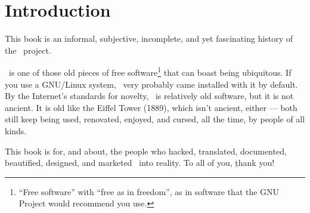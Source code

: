 
\chapter{Introduction}

This book is an informal, subjective, incomplete, and yet fascinating
history of the \GNOME\ project.

\GNOME\ is one of those old pieces of free software\footnote{``Free
  software'' with ``free as in freedom'', as in software that the GNU
  Project would recommend you use.} that can boast being ubiquitous.
If you use a GNU/Linux system, \GNOME\ very probably came installed
with it by default.  By the Internet's standards for novelty,
\GNOME\ is relatively old software, but it is not ancient.  It is old
like the Eiffel Tower (1889), which isn't ancient, either --- both
still keep being used, renovated, enjoyed, and cursed, all the time,
by people of all kinds.

This book is for, and about, the people who hacked, translated,
documented, beautified, designed, and marketed \GNOME\ into reality.
To all of you, \b{thank you!}
